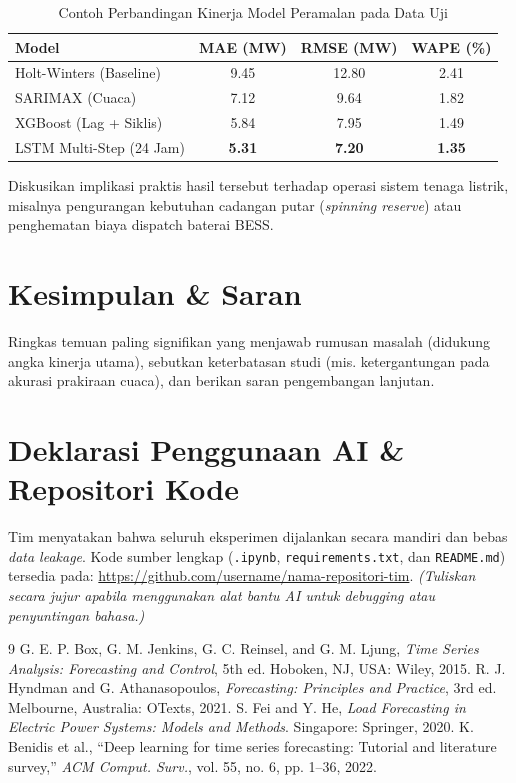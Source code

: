 \documentclass[conference]{IEEEtran}
\begin{document}
\begin{table}[htbp]
\caption{Contoh Perbandingan Kinerja Model Peramalan pada Data Uji}
\begin{center}
\begin{tabular}{lccc}
\toprule
\textbf{Model} & \textbf{MAE (MW)} & \textbf{RMSE (MW)} & \textbf{WAPE (\%)} \\
\midrule
Holt-Winters (Baseline) & 9.45 & 12.80 & 2.41 \\
SARIMAX (Cuaca) & 7.12 & 9.64 & 1.82 \\
XGBoost (Lag + Siklis) & 5.84 & 7.95 & 1.49 \\
LSTM Multi-Step (24 Jam) & \textbf{5.31} & \textbf{7.20} & \textbf{1.35} \\
\bottomrule
\end{tabular}
\label{tab:hasil}
\end{center}
\end{table}

Diskusikan implikasi praktis hasil tersebut terhadap operasi sistem tenaga listrik, misalnya pengurangan kebutuhan cadangan putar (\textit{spinning reserve}) atau penghematan biaya dispatch baterai BESS.

\section{Kesimpulan \& Saran}
Ringkas temuan paling signifikan yang menjawab rumusan masalah (didukung angka kinerja utama), sebutkan keterbatasan studi (mis. ketergantungan pada akurasi prakiraan cuaca), dan berikan saran pengembangan lanjutan.

\section*{Deklarasi Penggunaan AI \& Repositori Kode}
Tim menyatakan bahwa seluruh eksperimen dijalankan secara mandiri dan bebas \textit{data leakage}. Kode sumber lengkap (\texttt{.ipynb}, \texttt{requirements.txt}, dan \texttt{README.md}) tersedia pada: \url{https://github.com/username/nama-repositori-tim}. \textit{(Tuliskan secara jujur apabila menggunakan alat bantu AI untuk debugging atau penyuntingan bahasa.)}

\begin{thebibliography}{9}
 G. E. P. Box, G. M. Jenkins, G. C. Reinsel, and G. M. Ljung, \textit{Time Series Analysis: Forecasting and Control}, 5th ed. Hoboken, NJ, USA: Wiley, 2015.
 R. J. Hyndman and G. Athanasopoulos, \textit{Forecasting: Principles and Practice}, 3rd ed. Melbourne, Australia: OTexts, 2021.
 S. Fei and Y. He, \textit{Load Forecasting in Electric Power Systems: Models and Methods}. Singapore: Springer, 2020.
 K. Benidis et al., ``Deep learning for time series forecasting: Tutorial and literature survey,'' \textit{ACM Comput. Surv.}, vol. 55, no. 6, pp. 1--36, 2022.
\end{thebibliography}
\end{document}
